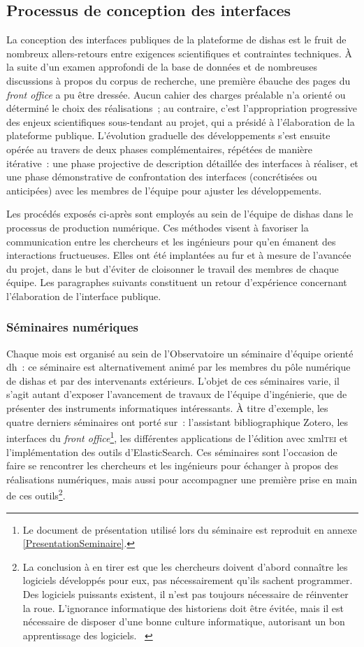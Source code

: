 \documentclass[a4paper,12pt,twoside]{book}
\newcommand{\eng}{\emph}
\newcommand{\bdd}{base de données\xspace}
\newcommand{\fo}{\eng{front office}\xspace}
\newcommand{\g}[1]{\og#1~\fg}
\newcommand{\dishas}{\gls{dishas}\xspace}
\newcommand{\xml}{\gls{xml}\xspace}
\newcommand{\dhu}{\gls{dh}\xspace}
\begin{document}
		\subsection{Processus de conception des interfaces}
La conception des interfaces publiques de la plateforme de \dishas est le fruit de nombreux allers-retours entre exigences scientifiques et contraintes techniques. À la suite d'un examen approfondi de la \bdd et de nombreuses discussions à propos du corpus de recherche, une première ébauche des pages du \fo a pu être dressée. Aucun cahier des charges préalable n'a orienté ou déterminé le choix des réalisations~; au contraire, c'est l'appropriation progressive des enjeux scientifiques sous-tendant au projet, qui a présidé à l'élaboration de la plateforme publique. L'évolution graduelle des développements s'est ensuite opérée au travers de deux phases complémentaires, répétées de manière itérative~: une phase projective de description détaillée des interfaces à réaliser, et une phase démonstrative de confrontation des interfaces (concrétisées ou anticipées) avec les membres de l'équipe pour ajuster les développements.

Les procédés exposés ci-après sont employés au sein de l'équipe de \dishas dans le processus de production numérique. Ces méthodes visent à favoriser la communication entre les chercheurs et les ingénieurs pour qu'en émanent des interactions fructueuses. Elles ont été implantées au fur et à mesure de l'avancée du projet, dans le but d'éviter de cloisonner le travail des membres de chaque équipe. Les paragraphes suivants constituent un retour d'expérience concernant l'élaboration de l'interface publique.

				\subsubsection{Séminaires numériques}
Chaque mois est organisé au sein de l'Observatoire un séminaire d'équipe orienté \dhu~: ce séminaire est alternativement animé par les membres du pôle numérique de \dishas et par des intervenants extérieurs. L'objet de ces séminaires varie, il s'agit autant d'exposer l'avancement de travaux de l'équipe d'ingénierie, que de présenter des instruments informatiques intéressants. À titre d'exemple, les quatre derniers séminaires ont porté sur~: l'assistant bibliographique Zotero, les interfaces du \fo\footnote{Le document de présentation utilisé lors du séminaire est reproduit en annexe \ref{PresentationSeminaire}.}, les différentes applications de l'édition avec \xml \textsc{tei} et l'implémentation des outils d'ElasticSearch. Ces séminaires sont l'occasion de faire se rencontrer les chercheurs et les ingénieurs pour échanger à propos des réalisations numériques, mais aussi pour accompagner une première prise en main de ces outils\footnote{\g{La conclusion à en tirer est que les chercheurs doivent d’abord connaître les logiciels développés pour eux, pas nécessairement qu’ils sachent programmer. Des logiciels puissants existent, il n’est pas toujours nécessaire de réinventer la roue. L’ignorance informatique des historiens doit être évitée, mais il est nécessaire de disposer d’une bonne culture informatique, autorisant un bon apprentissage des logiciels.} \cite[§~21]{clavertHistorienProgrammeur2012}}.
\end{document}
